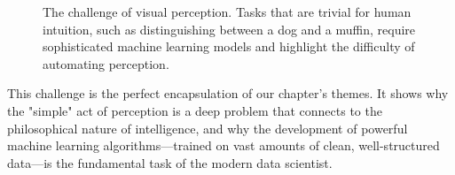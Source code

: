 \begin{figure}[h!]
    \centering
    \caption{The challenge of visual perception. Tasks that are trivial for human intuition, such as distinguishing between a dog and a muffin, require sophisticated machine learning models and highlight the difficulty of automating perception.}
    \label{fig:chihuahua_muffin}
\end{figure}

This challenge is the perfect encapsulation of our chapter's themes. It shows why the "simple" act of perception is a deep problem that connects to the philosophical nature of intelligence, and why the development of powerful machine learning algorithms—trained on vast amounts of clean, well-structured data—is the fundamental task of the modern data scientist.